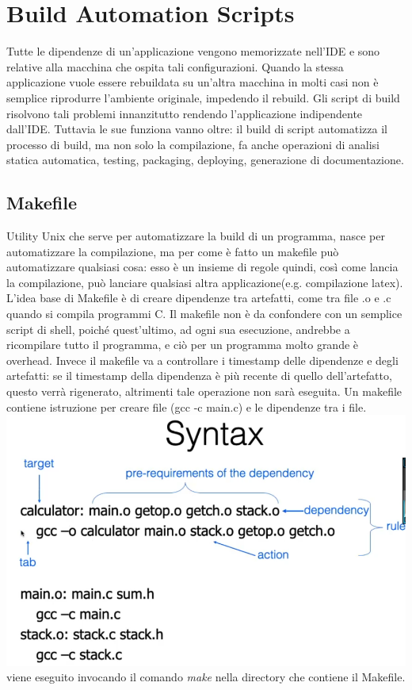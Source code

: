 \documentclass[10pt,a4paper]{book}
\begin{document}
\chapter{Build Automation Scripts}
Tutte le dipendenze di un'applicazione vengono memorizzate nell'IDE e sono relative alla macchina che ospita tali configurazioni. Quando la stessa applicazione vuole essere rebuildata su un'altra macchina in molti casi non è semplice riprodurre l'ambiente originale, impedendo il rebuild.
Gli script di build risolvono tali problemi innanzitutto rendendo l'applicazione indipendente dall'IDE. Tuttavia le sue funziona vanno oltre: il build di script automatizza il processo di build, ma non solo la compilazione, fa anche operazioni di analisi statica automatica, testing, packaging, deploying, generazione di documentazione.
\section{Makefile}
Utility Unix che serve per automatizzare la build di un programma, nasce per automatizzare la compilazione, ma per come è fatto un makefile può automatizzare qualsiasi cosa: esso è un insieme di regole quindi, così come lancia la compilazione, può lanciare qualsiasi altra applicazione(e.g. compilazione latex).
L'idea base di Makefile è di creare dipendenze tra artefatti, come tra file .o e .c quando si compila programmi C.
Il makefile non è da confondere con un semplice script di shell, poiché quest'ultimo, ad ogni sua esecuzione, andrebbe a ricompilare tutto il programma, e ciò per un programma molto grande è overhead.
Invece il makefile va a controllare i timestamp delle dipendenze e degli artefatti: se il timestamp della dipendenza è più recente di quello dell'artefatto, questo verrà rigenerato, altrimenti tale operazione non sarà eseguita.
Un makefile contiene istruzione per creare file (gcc -c main.c) e le dipendenze tra i file.\\
\includegraphics[scale=0.3]{makefile.png} \\
viene eseguito invocando il comando \textit{make} nella directory che contiene il Makefile.\\
\end{document}
